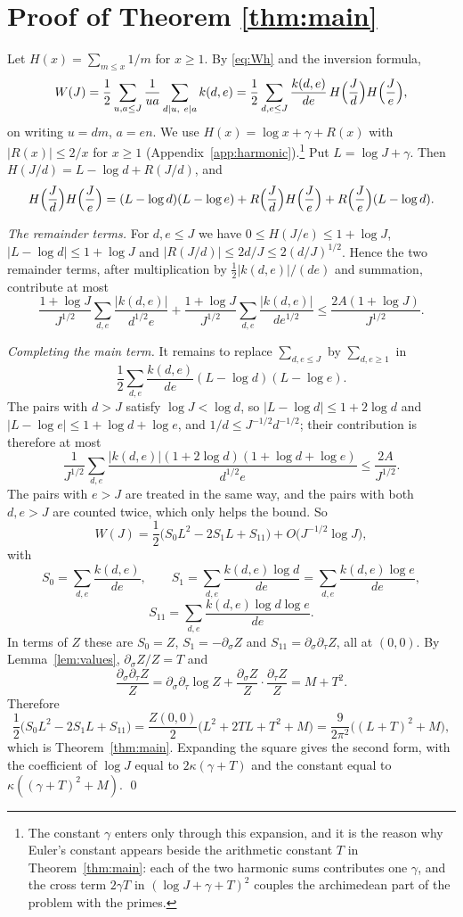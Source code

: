 \documentclass{amsart}
\theoremstyle{definition}
\theoremstyle{remark}
\numberwithin{equation}{section}
\begin{document}
\section{Proof of Theorem \ref{thm:main}}\label{sec:proof}

Let $H(x)=\sum_{m\le x}1/m$ for $x\ge1$. By \eqref{eq:Wh} and the inversion formula,
\[
W(J)=\frac12\sum_{u,a\le J}\frac1{ua}\sum_{d\mid u,\ e\mid a}k(d,e)=\frac12\sum_{d,e\le J}\frac{k(d,e)}{de}\,H\Bigl(\frac Jd\Bigr)H\Bigl(\frac Je\Bigr),
\]
on writing $u=dm$, $a=en$. We use $H(x)=\log x+\gamma+R(x)$ with $|R(x)|\le 2/x$ for $x\ge1$ (Appendix~\ref{app:harmonic}).\footnote{The constant $\gamma$ enters only through this expansion, and it is the reason why Euler's constant appears beside the arithmetic constant $T$ in Theorem~\ref{thm:main}: each of the two harmonic sums contributes one $\gamma$, and the cross term $2\gamma T$ in $(\log J+\gamma+T)^2$ couples the archimedean part of the problem with the primes.} Put $L=\log J+\gamma$. Then $H(J/d)=L-\log d+R(J/d)$, and
\[
H\Bigl(\frac Jd\Bigr)H\Bigl(\frac Je\Bigr)=(L-\log d)(L-\log e)+R\Bigl(\frac Jd\Bigr)H\Bigl(\frac Je\Bigr)+R\Bigl(\frac Je\Bigr)(L-\log d).
\]

\emph{The remainder terms.} For $d,e\le J$ we have $0\le H(J/e)\le1+\log J$, $|L-\log d|\le1+\log J$ and $|R(J/d)|\le 2d/J\le2(d/J)^{1/2}$. Hence the two remainder terms, after multiplication by $\frac12|k(d,e)|/(de)$ and summation, contribute at most
\[
\frac{1+\log J}{J^{1/2}}\sum_{d,e}\frac{|k(d,e)|}{d^{1/2}e}+\frac{1+\log J}{J^{1/2}}\sum_{d,e}\frac{|k(d,e)|}{de^{1/2}}\le\frac{2A(1+\log J)}{J^{1/2}}.
\]

\emph{Completing the main term.} It remains to replace $\sum_{d,e\le J}$ by $\sum_{d,e\ge1}$ in
\[
\frac12\sum_{d,e}\frac{k(d,e)}{de}(L-\log d)(L-\log e).
\]
The pairs with $d>J$ satisfy $\log J<\log d$, so $|L-\log d|\le1+2\log d$ and $|L-\log e|\le 1+\log d+\log e$, and $1/d\le J^{-1/2}d^{-1/2}$; their contribution is therefore at most
\[
\frac1{J^{1/2}}\sum_{d,e}\frac{|k(d,e)|(1+2\log d)(1+\log d+\log e)}{d^{1/2}e}\le\frac{2A}{J^{1/2}}.
\]
The pairs with $e>J$ are treated in the same way, and the pairs with both $d,e>J$ are counted twice, which only helps the bound. So
\[
W(J)=\frac12\bigl(S_0L^2-2S_1L+S_{11}\bigr)+O\bigl(J^{-1/2}\log J\bigr),
\]
with
\[
S_0=\sum_{d,e}\frac{k(d,e)}{de},\qquad S_1=\sum_{d,e}\frac{k(d,e)\log d}{de}=\sum_{d,e}\frac{k(d,e)\log e}{de},
\]
\[
S_{11}=\sum_{d,e}\frac{k(d,e)\log d\log e}{de}.
\]
In terms of $Z$ these are $S_0=Z$, $S_1=-\partial_\sigma Z$ and $S_{11}=\partial_\sigma\partial_\tau Z$, all at $(0,0)$. By Lemma~\ref{lem:values}, $\partial_\sigma Z/Z=T$ and
\[
\frac{\partial_\sigma\partial_\tau Z}{Z}=\partial_\sigma\partial_\tau\log Z+\frac{\partial_\sigma Z}{Z}\cdot\frac{\partial_\tau Z}{Z}=M+T^2.
\]
Therefore
\[
\frac12\bigl(S_0L^2-2S_1L+S_{11}\bigr)=\frac{Z(0,0)}2\bigl(L^2+2TL+T^2+M\bigr)=\frac9{2\pi^2}\bigl((L+T)^2+M\bigr),
\]
which is Theorem~\ref{thm:main}. Expanding the square gives the second form, with the coefficient of $\log J$ equal to $2\kappa(\gamma+T)$ and the constant equal to $\kappa((\gamma+T)^2+M)$. \qed
\end{document}
